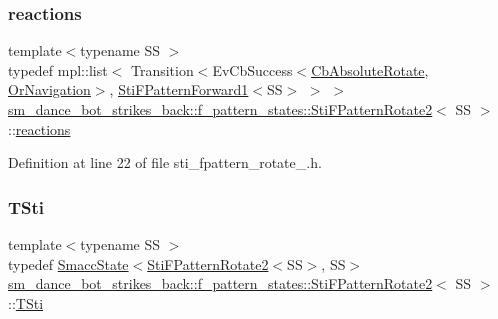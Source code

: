 \subsubsection{\texorpdfstring{reactions}{reactions}}
{\footnotesize\ttfamily template$<$typename SS $>$ \\
typedef mpl\+::list$<$ Transition$<$Ev\+Cb\+Success$<$\hyperlink{classcl__move__base__z_1_1CbAbsoluteRotate}{Cb\+Absolute\+Rotate}, \hyperlink{classsm__dance__bot__strikes__back_1_1OrNavigation}{Or\+Navigation}$>$, \hyperlink{structsm__dance__bot__strikes__back_1_1f__pattern__states_1_1StiFPatternForward1}{Sti\+F\+Pattern\+Forward1}$<$SS$>$ $>$ $>$ \hyperlink{structsm__dance__bot__strikes__back_1_1f__pattern__states_1_1StiFPatternRotate2}{sm\+\_\+dance\+\_\+bot\+\_\+strikes\+\_\+back\+::f\+\_\+pattern\+\_\+states\+::\+Sti\+F\+Pattern\+Rotate2}$<$ SS $>$\+::\hyperlink{structsm__dance__bot__strikes__back_1_1f__pattern__states_1_1StiFPatternRotate2_a38d675680103f33804a077e9f8fbec83}{reactions}}



Definition at line 22 of file sti\+\_\+fpattern\+\_\+rotate\+\_.\+h.

\mbox{\label{structsm__dance__bot__strikes__back_1_1f__pattern__states_1_1StiFPatternRotate2_aed3f2c5cc7b21876329a8767f46d14a3}} 
\subsubsection{\texorpdfstring{T\+Sti}{TSti}}
{\footnotesize\ttfamily template$<$typename SS $>$ \\
typedef \hyperlink{classSmaccState}{Smacc\+State}$<$\hyperlink{structsm__dance__bot__strikes__back_1_1f__pattern__states_1_1StiFPatternRotate2}{Sti\+F\+Pattern\+Rotate2}$<$SS$>$, SS$>$ \hyperlink{structsm__dance__bot__strikes__back_1_1f__pattern__states_1_1StiFPatternRotate2}{sm\+\_\+dance\+\_\+bot\+\_\+strikes\+\_\+back\+::f\+\_\+pattern\+\_\+states\+::\+Sti\+F\+Pattern\+Rotate2}$<$ SS $>$\+::\hyperlink{structsm__dance__bot__strikes__back_1_1f__pattern__states_1_1StiFPatternRotate2_aed3f2c5cc7b21876329a8767f46d14a3}{T\+Sti}}



